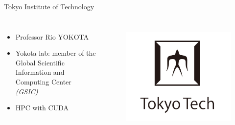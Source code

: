 \begin{frame}{Tokyo Institute of Technology}
	
	\begin{columns}
		\begin{itemize}
			\item Professor Rio YOKOTA
			\item Yokota lab: member of the Global Scientific Information and Computing Center \emph{(GSIC)}	
			\item HPC with CUDA
		
		\end{itemize}

		\begin{figure}[h!]
			\centering
			\includegraphics[width=1.2\linewidth]{tokyo_tech_logo}
			\label{fig:tokyotechlogo}
		\end{figure}
			
		
	\end{columns}

	
	
	
\end{frame}